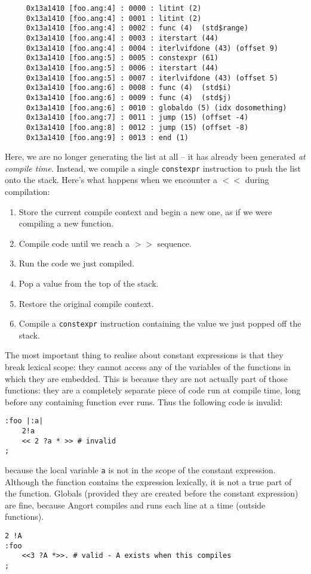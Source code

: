 \begin{lstlisting}
     0x13a1410 [foo.ang:4] : 0000 : litint (2) 
     0x13a1410 [foo.ang:4] : 0001 : litint (2) 
     0x13a1410 [foo.ang:4] : 0002 : func (4)  (std$range)
     0x13a1410 [foo.ang:4] : 0003 : iterstart (44) 
     0x13a1410 [foo.ang:4] : 0004 : iterlvifdone (43) (offset 9)
     0x13a1410 [foo.ang:5] : 0005 : constexpr (61) 
     0x13a1410 [foo.ang:5] : 0006 : iterstart (44) 
     0x13a1410 [foo.ang:5] : 0007 : iterlvifdone (43) (offset 5)
     0x13a1410 [foo.ang:6] : 0008 : func (4)  (std$i)
     0x13a1410 [foo.ang:6] : 0009 : func (4)  (std$j)
     0x13a1410 [foo.ang:6] : 0010 : globaldo (5) (idx dosomething)
     0x13a1410 [foo.ang:7] : 0011 : jump (15) (offset -4)
     0x13a1410 [foo.ang:8] : 0012 : jump (15) (offset -8)
     0x13a1410 [foo.ang:9] : 0013 : end (1) 
\end{lstlisting}
Here, we are no longer generating the list at all -- it has already
been generated \emph{at compile time.} Instead, we compile a single
\texttt{constexpr} instruction to push the list onto the stack.
Here's what happens when we encounter a $<<$ during compilation:
\begin{enumerate}
\item Store the current compile context and begin a new one, as if we 
were compiling a new function.
\item Compile code until we reach a $>>$ sequence.
\item Run the code we just compiled.
\item Pop a value from the top of the stack.
\item Restore the original compile context.
\item Compile a \texttt{constexpr} instruction containing the value
we just popped off the stack.
\end{enumerate}
The most important thing to realise about constant expressions is that
they break lexical scope: they cannot access any of the variables of
the functions in which they are embedded. This is because they are not
actually part of those functions: they are a completely separate piece of
code run at compile time, long before any containing function ever
runs. Thus the following code is invalid:
\begin{lstlisting}
:foo |:a|
    2!a
    << 2 ?a * >> # invalid
;
\end{lstlisting}
because the local variable \texttt{a} is not in the scope of the constant
expression. Although the function contains the expression lexically, it
is not a true part of the function. Globals (provided they are created
before the constant expression) are fine, because Angort compiles and
runs each line at a time (outside functions).
\begin{lstlisting}
2 !A
:foo
    <<3 ?A *>>. # valid - A exists when this compiles
;   
\end{lstlisting}

